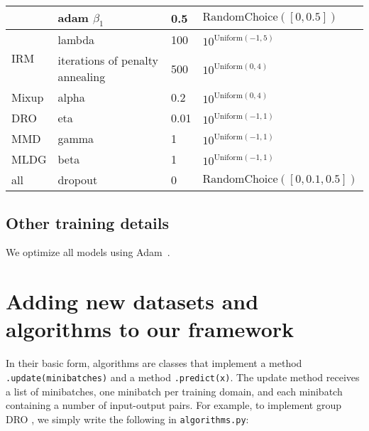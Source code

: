 \documentclass{article}
\begin{document}
\begin{table}[H]
\begin{center}
{\begin{tabular}{llll}
         & adam $\beta_1$             & 0.5    & $\text{RandomChoice}([0, 0.5])$\\
        \midrule
        \multirow{2}{*}{IRM}          & lambda  & 100    & $10^{\text{Uniform}(-1, 5)}$\\
                                      & iterations of penalty annealing & 500 & $10^{\text{Uniform}(0, 4)}$\\
        \midrule
        Mixup                         & alpha & 0.2 & $10^{\text{Uniform}(0, 4)}$\\
        \midrule
        DRO                           & eta   & 0.01 & $10^{\text{Uniform}(-1, 1)}$\\
        \midrule
        MMD                           & gamma & 1 & $10^{\text{Uniform}(-1, 1)}$\\
        \midrule
        MLDG           & beta & 1 & $10^{\text{Uniform}(-1, 1)}$\\
        \midrule
        all          & dropout & 0    & $\text{RandomChoice}([0, 0.1, 0.5])$\\
        \bottomrule
    \end{tabular}
    }
    \end{center}
    \label{table:hyperparameters}
\end{table}

\subsection{Other training details}

We optimize all models using Adam~\citep{kingma2014adam}.

\clearpage
\newpage
\section{Adding new datasets and algorithms to our framework}
\label{sec:code_example}

In their basic form, algorithms are classes that implement a method \texttt{.update(minibatches)} and a method \texttt{.predict(x)}.
The update method receives a list of minibatches, one minibatch per training domain, and each minibatch containing a number of input-output pairs. 
For example, to implement group DRO \citep[Algorithm 1]{sagawa2019distributionally}, we simply write the following in \texttt{algorithms.py}:

\end{document}
